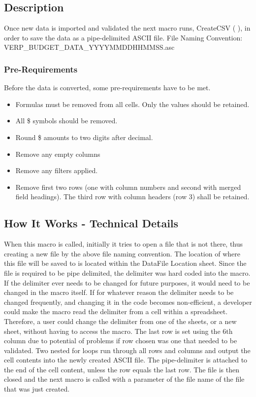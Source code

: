 \documentclass[12pt,a4paper]{report}
\begin{document}
   \subsection{Description}
    Once new data is imported and validated the next macro runs, CreateCSV ( ), in order to save the data as a pipe-delimited ASCII file.
    \newline
    \newline
    File Naming Convention: VERP\_BUDGET\_DATA\_YYYYMMDDHHMMSS.asc
    \subsubsection{Pre-Requirements}
    Before the data is converted, some pre-requirements have to be met.
        \begin{itemize}
            \item Formulas must be removed from all cells. Only the values should be retained.
            \item All \$ symbols should be removed.
            \item Round \$ amounts to two digits after decimal.
            \item Remove any empty columns
            \item Remove any filters applied.
            \item Remove first two rows (one with column numbers and second with merged field headings). The third row with column headers (row 3) shall be retained.
        \end{itemize}
    \subsection{How It Works - Technical Details}
    When this macro is called, initially it tries to open a file that is not there, thus creating a new file by the above file naming convention. The location of where this file will be saved to is located within the DataFile Location sheet.
    \newline
    \newline
    Since the file is required to be pipe delimited, the delimiter was hard coded into the macro. If the delimiter ever needs to be changed for future purposes, it would need to be changed in the macro itself. If for whatever reason the delimiter needs to be changed frequently, and changing it in the code becomes non-efficient, a developer could make the macro read the delimiter from a cell within a spreadsheet. Therefore, a user could change the delimiter from one of the sheets, or a new sheet, without having to access the macro.
    \newline
    \newline
    The last row is set using the 6th column due to potential of problems if row chosen was one that needed to be validated. Two nested for loops run through all rows and columns and output the cell contents into the newly created ASCII file. The pipe-delimiter is attached to the end of the cell content, unless the row equals the last row. The file is then closed and the next macro is called with a parameter of the file name of the file that was just created.
\end{document}
